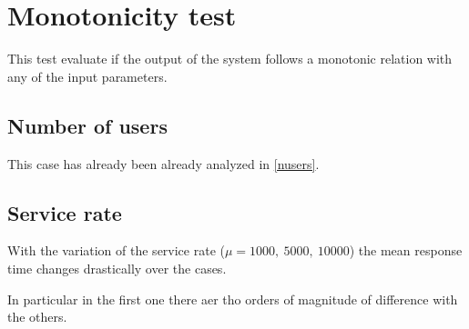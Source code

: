 \documentclass{report}
\begin{document}
\section{Monotonicity test}
This test evaluate if the output of the system follows a monotonic relation with any of the input parameters.

\subsection{Number of users}
This case has already been already analyzed in \autoref{nusers}.

\subsection{Service rate}
With the variation of the service rate ($\mu = 1000, \ 5000, \ 10000$) the mean response time changes drastically over the cases.

In particular in the first one there aer tho orders of magnitude of difference with the others.
\end{document}
